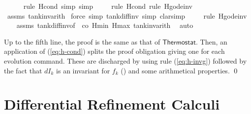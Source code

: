 \documentclass[envcountsame]{llncs}
\begin{document}
\begin{example}
\begin{isabellebody}
\ \ \ \ \ \isamarkupfalse%
{\isacharparenleft}rule\ H{\isacharunderscore}cond{\isacharcomma}\ simp{\isacharcomma}\ simp{\isacharparenright}{\isacharplus}\isanewline
\ \ \ \ \isamarkupfalse%
{\isacharparenleft}rule\ H{\isacharunderscore}cond{\isacharcomma}\ rule\ H{\isacharunderscore}g{\isacharunderscore}ode{\isacharunderscore}inv{\isacharparenright}\isanewline
\ \ \isamarkupfalse%
\ assms\ tank{\isacharunderscore}inv{\isacharunderscore}arith{}\ \isamarkupfalse%
{\isacharparenleft}force\ simp{\isacharcolon}\ tank{\isacharunderscore}diff{\isacharunderscore}inv{\isacharcomma}\ simp{\isacharcomma}\ clarsimp{\isacharparenright}\isanewline
\ \ \ \ \isamarkupfalse%
{\isacharparenleft}rule\ H{\isacharunderscore}g{\isacharunderscore}ode{\isacharunderscore}inv{\isacharparenright}\isanewline
\ \ \isamarkupfalse%
\ assms\ tank{\isacharunderscore}diff{\isacharunderscore}inv{\isacharbrackleft}of\ {\isacharunderscore}\ {\isachardoublequoteopen}{\isacharminus}c\isactrlsub o{\isachardoublequoteclose}\ Hmin\ Hmax{\isacharbrackright}\ tank{\isacharunderscore}inv{\isacharunderscore}arith{}\ \isamarkupfalse%
\ auto\isanewline
\end{isabellebody}

Up to the fifth line, the proof is the same as that of $\mathsf{Thermostat}$. Then, an application of (\ref{eq:h-cond}) splits the proof obligation giving one for each evolution command. These are discharged by using rule (\ref{eq:h-invg}) followed by the fact that $dI_k$ is an invariant for $f_k$ () and some arithmetical properties. \qed
\end{example}


\section{Differential Refinement Calculi}\label{sec:refine}
\end{document}
